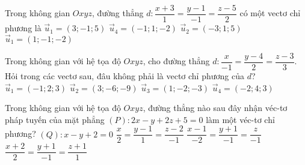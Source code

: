 \begin{ex}%
	Trong không gian $Oxyz$, đường thẳng $d:\dfrac{x+3}{1}=\dfrac{y-1}{-1}=\dfrac{z-5}{2}$ có một vectơ chỉ phương là
	\choice
		{$\overrightarrow{u}_1=\left(3;-1; 5\right)$}
		{\True $\overrightarrow{u}_4=\left(-1; 1;-2\right)$}
		{$\overrightarrow{u}_2=\left(-3; 1; 5\right)$}
		{$\overrightarrow{u}_1=\left(1;-1;-2\right)$}
\end{ex}

\begin{ex}%
	Trong không gian với hệ tọa độ $Oxyz$, cho đường thẳng $d:\dfrac{x}{-1}=\dfrac{y-4}{2}=\dfrac{z-3}{3}$. Hỏi trong các vectơ sau, đâu không phải là vectơ chỉ phương của $d$?
	\choice
		{$\overrightarrow{u}_1=\left(-1;2;3\right)$}
		{$\overrightarrow{u}_2=\left(3;-6;-9\right)$}
		{$\overrightarrow{u}_3=\left(1;-2;-3\right)$}
		{\True $\overrightarrow{u}_4=\left(-2;4;3\right)$}
\end{ex}
\begin{ex}%
	Trong không gian với hệ tọa độ $Oxyz$, đường thẳng nào sau đây nhận véc-tơ pháp tuyến của mặt phẳng $(P) \colon 2x-y+2z+5=0$ làm một véc-tơ chỉ phương?
	\choice
	{$( Q) \colon x-y+2=0$}
	{$\dfrac{x}{2}=\dfrac{y-1}{1}=\dfrac{z-2}{-1}$}
	{\True $\dfrac{x-1}{-2}=\dfrac{y+1}{-1}=\dfrac{z}{-1}$}
	{$\dfrac{x+2}{2}=\dfrac{y+1}{-1}=\dfrac{z+1}{1}$}
\end{ex}
